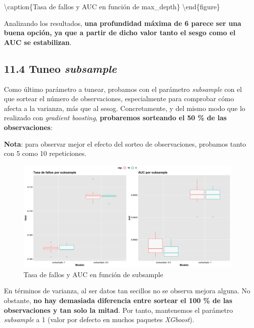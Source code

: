 \documentclass[
]{article}
\begin{document}
\textbackslash caption\{Tasa de fallos y AUC en función de
max\_depth\}\label{fig:unnamed-chunk-134} \textbackslash end\{figure\}

Analizando los resultados, \textbf{una profundidad máxima de 6 parece
ser una buena opción, ya que a partir de dicho valor tanto el sesgo como
el AUC se estabilizan}.

\hypertarget{tuneo-subsample}{%
\subsection{\texorpdfstring{11.4 Tuneo
\emph{subsample}}{11.4 Tuneo subsample}}\label{tuneo-subsample}}

Como último parámetro a tunear, probamos con el parámetro
\emph{subsample} con el que sortear el número de observaciones,
especialmente para comprobar cómo afecta a la varianza, más que al
sesog. Concretamente, y del mismo modo que lo realizado con
\emph{gradient boosting}, \textbf{probaremos sorteando el 50 \% de las
observaciones}:

\textbf{Nota}: para observar mejor el efecto del sorteo de
observaciones, probamos tanto con 5 como 10 repeticiones.

\begin{figure}[h!]

{\centering \includegraphics[width=0.99\linewidth,height=0.99\textheight,]{./charts/xgboost/subsample} 

}

\caption{Tasa de fallos y AUC en función de subsample}\label{fig:unnamed-chunk-135}
\end{figure}

En términos de varianza, al ser datos tan secillos no se observa mejora
alguna. No obstante, \textbf{no hay demasiada diferencia entre sortear
el 100 \% de las observaciones y tan solo la mitad}. Por tanto,
mantenemos el parámetro \emph{subsample} a 1 (valor por defecto en
muchos paquetes \emph{XGboost}).
\end{document}
